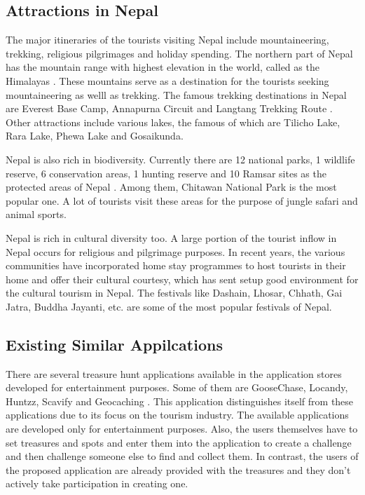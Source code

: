 \documentclass[12pt, a4paper, oneside]{article}
\begin{document}
\subsection{Attractions in Nepal}
The major itineraries of the tourists visiting Nepal include mountaineering, trekking, religious pilgrimages and holiday spending. The northern part of Nepal has the mountain range with highest elevation in the world, called as the Himalayas \cite{himalayas}. These mountains serve as a destination for the tourists seeking mountaineering as welll as trekking. The famous trekking destinations in Nepal are Everest Base Camp, Annapurna Circuit and Langtang Trekking Route \cite{trekkingroutes}. Other attractions include various lakes, the famous of which are Tilicho Lake, Rara Lake, Phewa Lake and Gosaikunda.

Nepal is also rich in biodiversity. Currently there are 12 national parks, 1 wildlife reserve, 6 conservation areas, 1 hunting reserve and 10 Ramsar sites as the protected areas of Nepal \cite{protectedareas}. Among them, Chitawan National Park is the most popular one. A lot of tourists visit these areas for the purpose of jungle safari and animal sports.

Nepal is rich in cultural diversity too. A large portion of the tourist inflow in Nepal occurs for religious and pilgrimage purposes. In recent years, the various communities have incorporated home stay programmes to host tourists in their home and offer their cultural courtesy, which has sent setup good environment for the cultural tourism in Nepal. The festivals like Dashain, Lhosar, Chhath, Gai Jatra, Buddha Jayanti, etc. are some of the most popular festivals of Nepal.

\subsection{Existing Similar Appilcations}
There are several treasure hunt applications available in the application stores developed for entertainment purposes. Some of them are GooseChase, Locandy, Huntzz, Scavify and Geocaching \cite{similarapps}. This application distinguishes itself from these applications due to its focus on the tourism industry. The available applications are developed only for entertainment purposes. Also, the users themselves have to set treasures and spots and enter them into the application to create a challenge and then challenge someone else to find and collect them. In contrast, the users of the proposed application are already provided with the treasures and they don't actively take participation in creating one.
\end{document}

